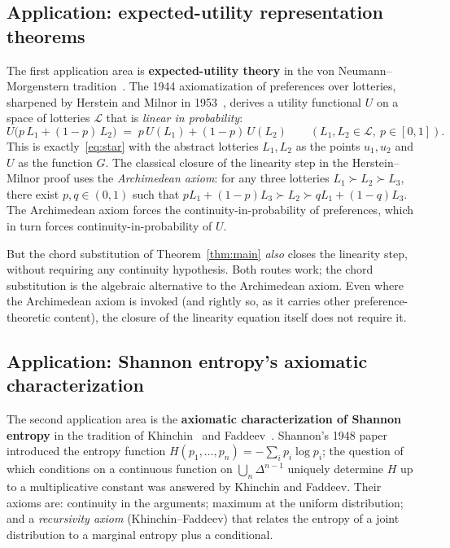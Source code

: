 \documentclass[review,12pt,a4paper]{elsarticle}
\theoremstyle{remark}
\begin{document}
\subsection{Application: expected-utility representation theorems}
\label{ssec:utility}

The first application area is \textbf{expected-utility theory} in the
von Neumann--Morgenstern tradition~\cite{vNM1944}. The 1944 axiomatization
of preferences over lotteries, sharpened by Herstein and Milnor in
1953~\cite{HersteinMilnor1953}, derives a utility functional $U$ on a
space of lotteries $\mathcal L$ that is \emph{linear in probability}:
\[
U\bigl(p\,L_1+(1-p)\,L_2\bigr) \;=\; p\,U(L_1)+(1-p)\,U(L_2)
\qquad (L_1,L_2\in\mathcal L,\ p\in[0,1]).
\]
This is exactly~\eqref{eq:star} with the abstract lotteries $L_1,L_2$ as
the points $u_1,u_2$ and $U$ as the function $G$. The classical closure of
the linearity step in the Herstein--Milnor proof uses the
\emph{Archimedean axiom}: for any three lotteries $L_1\succ L_2\succ L_3$,
there exist $p,q\in(0,1)$ such that
$pL_1+(1-p)L_3\succ L_2\succ qL_1+(1-q)L_3$. The Archimedean axiom forces
the continuity-in-probability of preferences, which in turn forces
continuity-in-probability of $U$.

But the chord substitution of Theorem~\ref{thm:main} \emph{also} closes
the linearity step, without requiring any continuity hypothesis. Both
routes work; the chord substitution is the algebraic alternative to the
Archimedean axiom. Even where the Archimedean axiom is invoked (and
rightly so, as it carries other preference-theoretic content), the
closure of the linearity equation itself does not require it.

\subsection{Application: Shannon entropy's axiomatic characterization}
\label{ssec:entropy}

The second application area is the \textbf{axiomatic characterization of
Shannon entropy} in the tradition of Khinchin~\cite{Khinchin1957} and
Faddeev~\cite{Faddeev1957}. Shannon's 1948 paper introduced the entropy
function $H(p_1,\ldots,p_n)=-\sum_i p_i\log p_i$; the question of which
conditions on a continuous function on $\bigcup_n\Delta^{n-1}$ uniquely
determine $H$ up to a multiplicative constant was answered by Khinchin and
Faddeev. Their axioms are: continuity in the arguments; maximum at the
uniform distribution; and a \emph{recursivity axiom} (Khinchin--Faddeev)
that relates the entropy of a joint distribution to a marginal entropy
plus a conditional.
\end{document}
